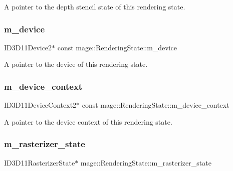 A pointer to the depth stencil state of this rendering state. \hypertarget{structmage_1_1_rendering_state_a7985712bda141bfac079d4fb6d85cfec}{}\label{structmage_1_1_rendering_state_a7985712bda141bfac079d4fb6d85cfec} 
\subsubsection{\texorpdfstring{m\+\_\+device}{m\_device}}
{\footnotesize\ttfamily I\+D3\+D11\+Device2$\ast$ const mage\+::\+Rendering\+State\+::m\+\_\+device\hspace{0.3cm}{\ttfamily [private]}}

A pointer to the device of this rendering state. \hypertarget{structmage_1_1_rendering_state_a13e46783f38a60fe032dc2aad708ec48}{}\label{structmage_1_1_rendering_state_a13e46783f38a60fe032dc2aad708ec48} 
\subsubsection{\texorpdfstring{m\+\_\+device\+\_\+context}{m\_device\_context}}
{\footnotesize\ttfamily I\+D3\+D11\+Device\+Context2$\ast$ const mage\+::\+Rendering\+State\+::m\+\_\+device\+\_\+context\hspace{0.3cm}{\ttfamily [private]}}

A pointer to the device context of this rendering state. \hypertarget{structmage_1_1_rendering_state_a63b8c00bd0e2e1c56bd2a42f269733a8}{}\label{structmage_1_1_rendering_state_a63b8c00bd0e2e1c56bd2a42f269733a8} 
\subsubsection{\texorpdfstring{m\+\_\+rasterizer\+\_\+state}{m\_rasterizer\_state}}
{\footnotesize\ttfamily I\+D3\+D11\+Rasterizer\+State$\ast$ mage\+::\+Rendering\+State\+::m\+\_\+rasterizer\+\_\+state\hspace{0.3cm}{\ttfamily [private]}}

